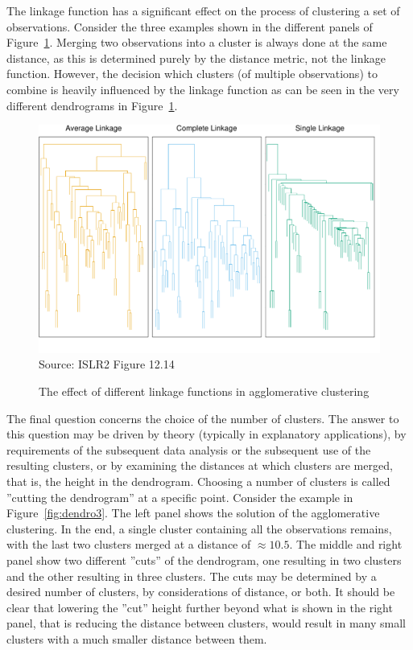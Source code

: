 The linkage function has a significant effect on the process of clustering a set of observations. Consider the three examples shown in the different panels of Figure~\ref{fig:dendro2}. Merging two observations into a cluster is always done at the same distance, as this is determined purely by the distance metric, not the linkage function. However, the decision which clusters (of multiple observations) to combine is heavily influenced by the linkage function as can be seen in the very different dendrograms in Figure~\ref{fig:dendro2}. 

\begin{figure}
\centering
\includegraphics[width=.9\textwidth]{../class11/Figures_Chapters_7-13/Chapter12/12_14.pdf} \\

\scriptsize Source: ISLR2 Figure 12.14
\caption{The effect of different linkage functions in agglomerative clustering}
\label{fig:dendro2}
\end{figure}

The final question concerns the choice of the number of clusters. The answer to this question may be driven by theory (typically in explanatory applications), by requirements of the subsequent data analysis or the subsequent use of the resulting clusters, or by examining the distances at which clusters are merged, that is, the height in the dendrogram. Choosing a number of clusters is called ''cutting the dendrogram'' at a specific point. Consider the example in Figure~\ref{fig:dendro3}. The left panel shows the solution of the agglomerative clustering. In the end, a single cluster containing all the observations remains, with the last two clusters merged at a distance of $\approx 10.5$. The middle and right panel show two different ''cuts'' of the dendrogram, one resulting in two clusters and the other resulting in three clusters. The cuts may be determined by a desired number of clusters, by considerations of distance, or both. It should be clear that lowering the ''cut'' height further beyond what is shown in the right panel, that is reducing the distance between clusters, would result in many small clusters with a much smaller distance between them. 

